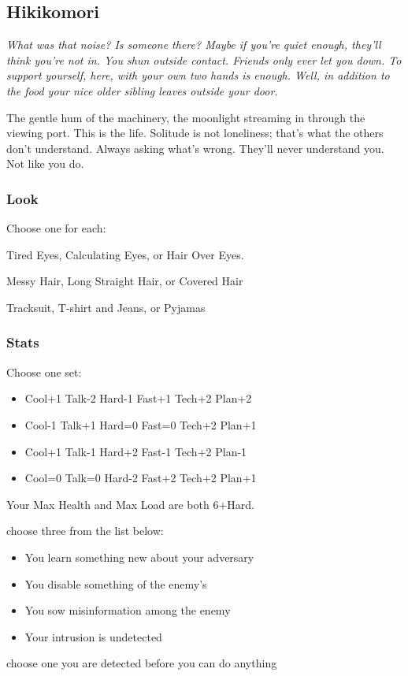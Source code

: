 \subsection{Hikikomori}
{\itshape What was that noise? Is someone there? Maybe if you're quiet
  enough, they'll think you're not in. You shun outside
  contact. Friends only ever let you down. To support yourself, here,
  with your own two hands is enough. Well, in addition to the food
  your nice older sibling leaves outside your door.

The gentle hum of the machinery, the moonlight streaming in through
the viewing port. This is the life. Solitude is not loneliness; that's
what the others don't understand. Always asking what's wrong. They'll
never understand you. Not like you do.}

\subsubsection{Look}
Choose one for each:

Tired Eyes, Calculating Eyes, or Hair Over Eyes.

Messy Hair, Long Straight Hair, or Covered Hair

Tracksuit, T-shirt and Jeans, or Pyjamas

\subsubsection{Stats}
Choose one set:
\begin{itemize}
\setlength\itemsep{0em}
\item Cool+1 Talk-2 Hard-1 Fast+1 Tech+2 Plan+2
\item Cool-1 Talk+1 Hard=0 Fast=0 Tech+2 Plan+1
\item Cool+1 Talk-1 Hard+2 Fast-1 Tech+2 Plan-1
\item Cool=0 Talk=0 Hard-2 Fast+2 Tech+2 Plan+1
\end{itemize}

Your Max Health and Max Load are both 6+Hard.

{choose three from the list below:
\begin{itemize}
\item You learn something new about your adversary
\item You disable something of the enemy's
\item You sow misinformation among the enemy
\item Your intrusion is undetected
\end{itemize}}
{choose one}
{you are detected before you can do anything}

